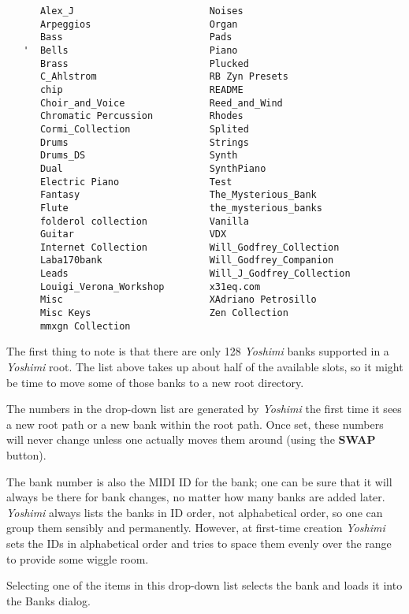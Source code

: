    \begin{verbatim}
      Alex_J                        Noises
      Arpeggios                     Organ
      Bass                          Pads
   '  Bells                         Piano
      Brass                         Plucked
      C_Ahlstrom                    RB Zyn Presets
      chip                          README
      Choir_and_Voice               Reed_and_Wind
      Chromatic Percussion          Rhodes
      Cormi_Collection              Splited
      Drums                         Strings
      Drums_DS                      Synth
      Dual                          SynthPiano
      Electric Piano                Test
      Fantasy                       The_Mysterious_Bank
      Flute                         the_mysterious_banks
      folderol collection           Vanilla
      Guitar                        VDX
      Internet Collection           Will_Godfrey_Collection
      Laba170bank                   Will_Godfrey_Companion
      Leads                         Will_J_Godfrey_Collection
      Louigi_Verona_Workshop        x31eq.com
      Misc                          XAdriano Petrosillo
      Misc Keys                     Zen Collection
      mmxgn Collection
   \end{verbatim}

   The first thing to note is that there are only 128 \textsl{Yoshimi} banks
   supported in a \textsl{Yoshimi} root.  The list above takes up about half
   of the available slots, so it might be time to move some of those banks
   to a new root directory.

   The numbers in the drop-down list are generated by \textsl{Yoshimi} the
   first time it sees a new root path or a new bank within the root path.
   Once set, these numbers will never change unless one actually moves them
   around (using the \textbf{SWAP} button).

   The bank number is also the MIDI ID for the bank;
   one can be sure that it will always
   be there for bank changes, no matter how many banks are added later.
   \textsl{Yoshimi} always lists the banks in ID order, not alphabetical
   order, so one can group them sensibly and permanently.
   However, at first-time creation \textsl{Yoshimi} sets the IDs in
   alphabetical order and tries to space them evenly over the range to
   provide some wiggle room.                                        

   Selecting one of the items in this drop-down list selects the bank and
   loads it into the Banks dialog.


